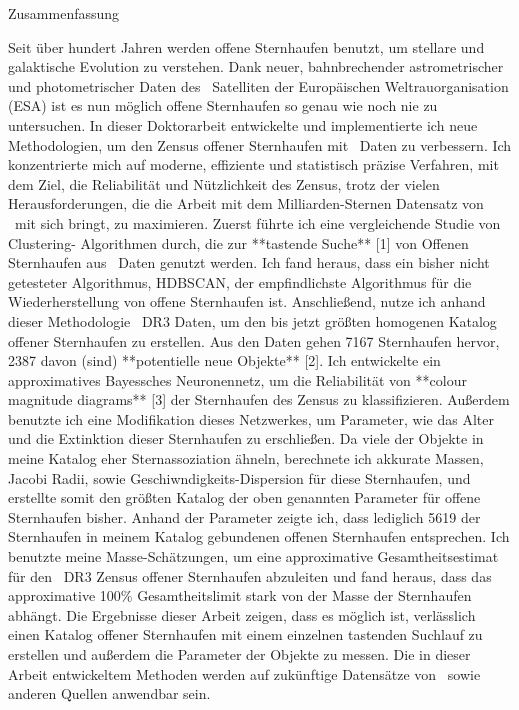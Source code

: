 {Zusammenfassung}
\label{sec:abstract-diff}

Seit über hundert Jahren werden offene Sternhaufen benutzt, um stellare und galaktische Evolution zu verstehen. 
Dank neuer, bahnbrechender astrometrischer und photometrischer Daten des \gaia\ Satelliten der Europäischen Weltrauorganisation (ESA) ist es nun möglich offene Sternhaufen so genau wie noch nie zu untersuchen. 
In dieser Doktorarbeit entwickelte und implementierte ich neue Methodologien, um den Zensus offener Sternhaufen mit \gaia\ Daten zu verbessern. 
Ich konzentrierte mich auf moderne, effiziente und statistisch präzise Verfahren, mit dem Ziel, die Reliabilität und Nützlichkeit des Zensus, trotz der vielen Herausforderungen, die die Arbeit mit dem Milliarden-Sternen Datensatz von \gaia\ mit sich bringt, zu maximieren. 
Zuerst führte ich eine vergleichende Studie von Clustering- Algorithmen durch, die zur **tastende Suche** [1] von Offenen Sternhaufen aus \gaia\ Daten genutzt werden. 
Ich fand heraus, dass ein bisher nicht getesteter Algorithmus, HDBSCAN, der empfindlichste Algorithmus für die Wiederherstellung von offene Sternhaufen ist.
Anschließend, nutze ich anhand dieser Methodologie \gaia\ DR3 Daten, um den bis jetzt größten homogenen Katalog offener Sternhaufen zu erstellen. 
Aus den Daten gehen 7167 Sternhaufen hervor, 2387 davon (sind) **potentielle neue Objekte** [2]. 
Ich entwickelte ein approximatives Bayessches Neuronennetz, um die Reliabilität von **colour magnitude diagrams** [3] der Sternhaufen des Zensus zu klassifizieren. 
Außerdem benutzte ich eine Modifikation dieses Netzwerkes, um Parameter, wie das Alter und die Extinktion dieser Sternhaufen zu erschließen.
Da viele der Objekte in meine Katalog eher Sternassoziation ähneln, berechnete ich akkurate Massen, Jacobi Radii, sowie Geschiwndigkeits-Dispersion für diese Sternhaufen, und erstellte somit den größten Katalog der oben genannten Parameter für offene Sternhaufen bisher. 
Anhand der Parameter zeigte ich, dass lediglich 5619 der Sternhaufen in meinem Katalog gebundenen offenen Sternhaufen entsprechen. 
Ich benutzte meine Masse-Schätzungen, um eine approximative Gesamtheitsestimat für den \gaia\ DR3 Zensus offener Sternhaufen abzuleiten und fand heraus, dass das approximative 100\% Gesamtheitslimit stark von der Masse der Sternhaufen abhängt. 
Die Ergebnisse dieser Arbeit zeigen, dass es möglich ist, verlässlich einen Katalog offener Sternhaufen mit einem einzelnen tastenden Suchlauf zu erstellen und außerdem die Parameter der Objekte zu messen. 
Die in dieser Arbeit entwickeltem Methoden werden auf zukünftige Datensätze von \gaia\ sowie anderen Quellen anwendbar sein. 

